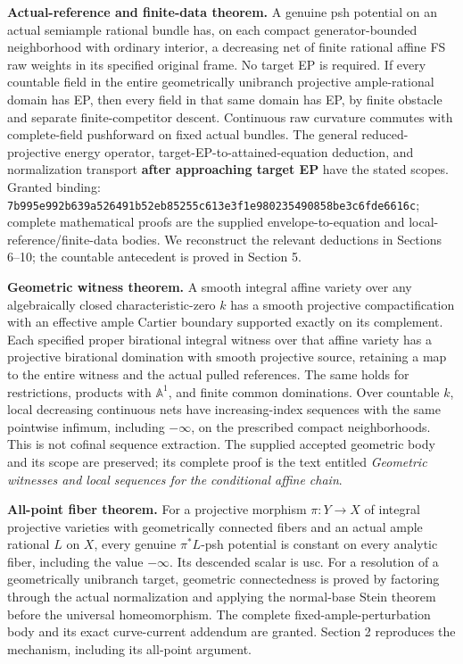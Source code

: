 \documentclass[
  10pt,
]{article}
\begin{document}
\textbf{Actual-reference and finite-data theorem.} A genuine psh
potential on an actual semiample rational bundle has, on each compact
generator-bounded neighborhood with ordinary interior, a decreasing net
of finite rational affine FS raw weights in its specified original
frame. No target EP is required. If every countable field in the entire
geometrically unibranch projective ample-rational domain has EP, then
every field in that same domain has EP, by finite obstacle and separate
finite-competitor descent. Continuous raw curvature commutes with
complete-field pushforward on fixed actual bundles. The general
reduced-projective energy operator, target-EP-to-attained-equation
deduction, and normalization transport \textbf{after approaching target
EP} have the stated scopes. Granted binding:
\texttt{7b995e99\allowbreak{}2b639a52\allowbreak{}6491b52e\allowbreak{}b85255c6\allowbreak{}13e3f1e9\allowbreak{}80235490\allowbreak{}858be3c6\allowbreak{}fde6616c};
complete mathematical proofs are the supplied envelope-to-equation and
local-reference/finite-data bodies. We reconstruct the relevant
deductions in Sections 6--10; the countable antecedent is proved in
Section 5.

\textbf{Geometric witness theorem.} A smooth integral affine variety
over any algebraically closed characteristic-zero \(k\) has a smooth
projective compactification with an effective ample Cartier boundary
supported exactly on its complement. Each specified proper birational
integral witness over that affine variety has a projective birational
domination with smooth projective source, retaining a map to the entire
witness and the actual pulled references. The same holds for
restrictions, products with \(\mathbb A^1\), and finite common
dominations. Over countable \(k\), local decreasing continuous nets have
increasing-index sequences with the same pointwise infimum, including
\(-\infty\), on the prescribed compact neighborhoods. This is not
cofinal sequence extraction. The supplied accepted geometric body and
its scope are preserved; its complete proof is the text entitled
\emph{Geometric witnesses and local sequences for the conditional affine
chain}.

\textbf{All-point fiber theorem.} For a projective morphism
\(\pi:Y\to X\) of integral projective varieties with geometrically
connected fibers and an actual ample rational \(L\) on \(X\), every
genuine \(\pi^*L\)-psh potential is constant on every analytic fiber,
including the value \(-\infty\). Its descended scalar is usc. For a
resolution of a geometrically unibranch target, geometric connectedness
is proved by factoring through the actual normalization and applying the
normal-base Stein theorem before the universal homeomorphism. The
complete fixed-ample-perturbation body and its exact curve-current
addendum are granted. Section 2 reproduces the mechanism, including its
all-point argument.
\end{document}
